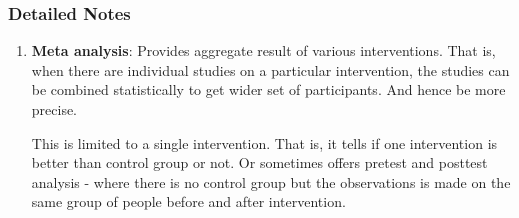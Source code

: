 \documentclass{article}
\begin{document}
\subsubsection{Detailed Notes}
\begin{enumerate}
    \item \textbf{Meta analysis}: Provides aggregate result of various interventions. 
    That is, when there are individual studies on a particular intervention, the studies can be combined statistically to get wider set of participants.
    And hence be more precise.

    This is limited to a single intervention. That is, it tells if one intervention is better than control group or not. Or sometimes offers pretest and posttest analysis - where there is no control group but the observations is made on the same group of people before and after intervention.
    \cite{Meta_Analysis1} \cite{Meta_Analysis2}


\end{enumerate}
\end{document}
